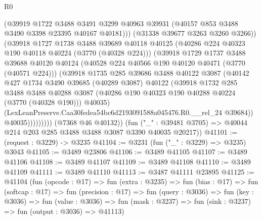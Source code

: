 \begin{lexlean}{R0}
\begin{coremodule}
                        (@39919
                          @1722
                          @3488
                          @3491
                          @3299
                          @40963
                          @39931
                          (@40157 @853 @3488 @3490 @3398 @23395 @40167 @40181)))
                      (@31338 @39677 @3263 @3260 @3266))
                    (@39918
                      @1727
                      @1738
                      @3488
                      @39689
                      @40118
                      @40125
                      (@40286 @224 @40323 @190 @40118 @40224 (@3770 (@40328 @224)))
                      (@39918
                        @1729
                        @1737
                        @3488
                        @39688
                        @40120
                        @40124
                        (@40528 @224 @40566 @190 @40120 @40471 (@3770 (@40571 @224)))
                        (@39918
                          @1735
                          @285
                          @39686
                          @3488
                          @40122
                          @3087
                          (@40142
                            @427
                            @1734
                            @3490
                            @39685
                            (@40289 @3087)
                            @40122
                            (@39918
                              @1732
                              @285
                              @3488
                              @3488
                              @40288
                              @3087
                              (@40286 @190 @40323 @190 @40288 @40224 (@3770 (@40328 @190)))
                              @40035)
                            (LexLeanPreserve.Caa30fedea54bc6d2193091588a045476.R0.__rel_24 @39684))
                          @40035)))))))))
        (@7368 @46 @40132))
      (fun ("_" : @39481 @3705) => @40044 @214 @203 @285 @3488 @3488 @3087 @3390 @40035 @20217))
@41101 := (request : @3229) -> @3235
@41104 := @3231 (fun ("_" : @3229) => @3235) @3043
@41105 := @3489 @23806
@41106 := @3489 @41105
@41107 := @3489 @41106
@41108 := @3489 @41107
@41109 := @3489 @41108
@41110 := @3489 @41109
@41111 := @3489 @41110
@41113 := @3487 @41111 @23895
@41125 := @41104
    (fun (opcode : @17) =>
    fun (extra : @3235) =>
    fun (bias : @17) =>
    fun (softcap : @17) =>
    fun (precision : @17) =>
    fun (query : @3036) =>
    fun (key : @3036) =>
    fun (value : @3036) =>
    fun (mask : @3237) => fun (sink : @3237) => fun (output : @3036) => @41113)

\end{coremodule}
\end{lexlean}
